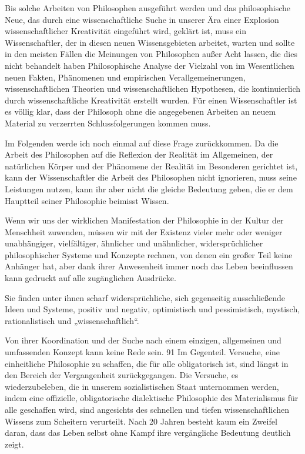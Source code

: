 \documentclass[11pt,a4paper]{book}
\begin{document}
Bis solche Arbeiten von Philosophen ausgeführt werden und das philosophische Neue, das durch eine wissenschaftliche Suche in unserer Ära einer Explosion wissenschaftlicher Kreativität eingeführt wird, geklärt ist, muss ein Wissenschaftler, der in diesen neuen Wissensgebieten arbeitet, warten und sollte in den meisten Fällen die Meinungen von Philosophen außer Acht lassen, die dies nicht behandelt haben Philosophische Analyse der Vielzahl von im Wesentlichen neuen Fakten, Phänomenen und empirischen Verallgemeinerungen, wissenschaftlichen Theorien und wissenschaftlichen Hypothesen, die kontinuierlich durch wissenschaftliche Kreativität erstellt wurden. Für einen Wissenschaftler ist es völlig klar, dass der Philosoph ohne die angegebenen Arbeiten an neuem Material zu verzerrten Schlussfolgerungen kommen muss.



Im Folgenden werde ich noch einmal auf diese Frage zurückkommen. Da die Arbeit des Philosophen auf die Reflexion der Realität im Allgemeinen, der natürlichen Körper und der Phänomene der Realität im Besonderen gerichtet ist, kann der Wissenschaftler die Arbeit des Philosophen nicht ignorieren, muss seine Leistungen nutzen, kann ihr aber nicht die gleiche Bedeutung geben, die er dem Hauptteil seiner Philosophie beimisst Wissen.



Wenn wir uns der wirklichen Manifestation der Philosophie in der Kultur der Menschheit zuwenden, müssen wir mit der Existenz vieler mehr oder weniger unabhängiger, vielfältiger, ähnlicher und unähnlicher, widersprüchlicher philosophischer Systeme und Konzepte rechnen, von denen ein großer Teil keine Anhänger hat, aber dank ihrer Anwesenheit immer noch das Leben beeinflussen kann gedruckt auf alle zugänglichen Ausdrücke.



Sie finden unter ihnen scharf widersprüchliche, sich gegenseitig ausschließende Ideen und Systeme, positiv und negativ, optimistisch und pessimistisch, mystisch, rationalistisch und „wissenschaftlich“.



Von ihrer Koordination und der Suche nach einem einzigen, allgemeinen und umfassenden Konzept kann keine Rede sein. 91 Im Gegenteil. Versuche, eine einheitliche Philosophie zu schaffen, die für alle obligatorisch ist, sind längst in den Bereich der Vergangenheit zurückgegangen. Die Versuche, es wiederzubeleben, die in unserem sozialistischen Staat unternommen werden, indem eine offizielle, obligatorische dialektische Philosophie des Materialismus für alle geschaffen wird, sind angesichts des schnellen und tiefen wissenschaftlichen Wissens zum Scheitern verurteilt. Nach 20 Jahren besteht kaum ein Zweifel daran, dass das Leben selbst ohne Kampf ihre vergängliche Bedeutung deutlich zeigt.
\end{document}
